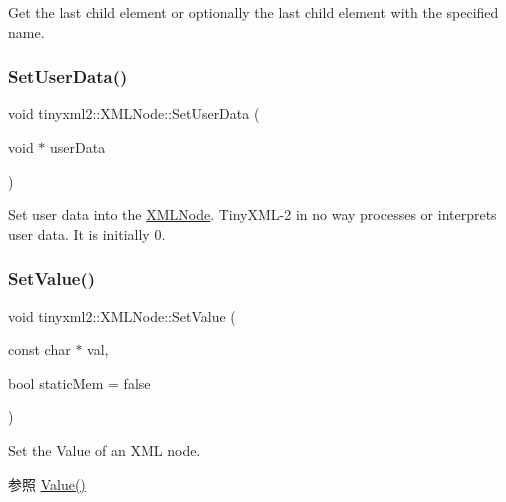 Get the last child element or optionally the last child element with the specified name. \mbox{\label{classtinyxml2_1_1_x_m_l_node_a002978fc889cc011d143185f2377eca2}} 
\subsubsection{\texorpdfstring{Set\+User\+Data()}{SetUserData()}}
{\footnotesize\ttfamily void tinyxml2\+::\+X\+M\+L\+Node\+::\+Set\+User\+Data (\begin{DoxyParamCaption}\item[{void $\ast$}]{user\+Data }\end{DoxyParamCaption})\hspace{0.3cm}{\ttfamily [inline]}}

Set user data into the \hyperlink{classtinyxml2_1_1_x_m_l_node}{X\+M\+L\+Node}. Tiny\+X\+M\+L-\/2 in no way processes or interprets user data. It is initially 0. \mbox{\label{classtinyxml2_1_1_x_m_l_node_a09dd68cf9eae137579f6e50f36487513}} 
\subsubsection{\texorpdfstring{Set\+Value()}{SetValue()}}
{\footnotesize\ttfamily void tinyxml2\+::\+X\+M\+L\+Node\+::\+Set\+Value (\begin{DoxyParamCaption}\item[{const char $\ast$}]{val,  }\item[{bool}]{static\+Mem = {\ttfamily false} }\end{DoxyParamCaption})}

Set the Value of an X\+ML node. \begin{DoxySeeAlso}{参照}
\hyperlink{classtinyxml2_1_1_x_m_l_node_a0485e51c670e741884cfd8362274d680}{Value()} 
\end{DoxySeeAlso}
\mbox{\label{classtinyxml2_1_1_x_m_l_node_a8402cbd3129d20e9e6024bbcc0531283}} 
